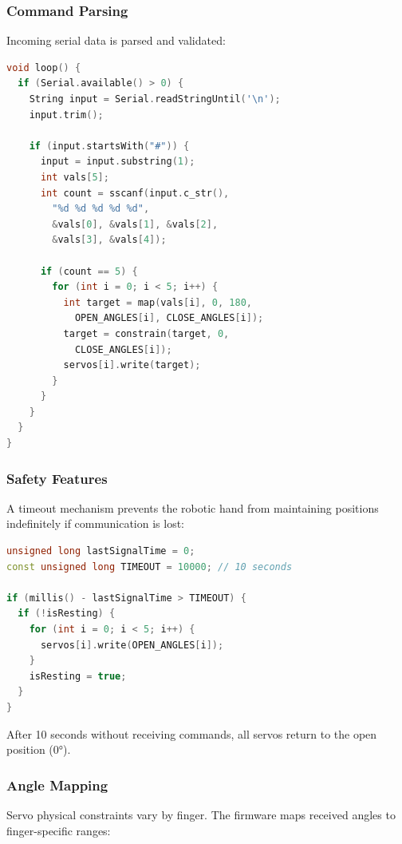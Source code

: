 \documentclass[12pt]{article}
\begin{document}
\subsubsection{Command Parsing}

Incoming serial data is parsed and validated:

\begin{lstlisting}[language=C++, caption=Command Parsing]
void loop() {
  if (Serial.available() > 0) {
    String input = Serial.readStringUntil('\n');
    input.trim();
    
    if (input.startsWith("#")) {
      input = input.substring(1);
      int vals[5];
      int count = sscanf(input.c_str(), 
        "%d %d %d %d %d", 
        &vals[0], &vals[1], &vals[2], 
        &vals[3], &vals[4]);

      if (count == 5) {
        for (int i = 0; i < 5; i++) {
          int target = map(vals[i], 0, 180, 
            OPEN_ANGLES[i], CLOSE_ANGLES[i]);
          target = constrain(target, 0, 
            CLOSE_ANGLES[i]);
          servos[i].write(target);
        }
      }
    }
  }
}
\end{lstlisting}

\subsubsection{Safety Features}

A timeout mechanism prevents the robotic hand from maintaining positions indefinitely if communication is lost:

\begin{lstlisting}[language=C++, caption=Timeout Safety Mechanism]
unsigned long lastSignalTime = 0;
const unsigned long TIMEOUT = 10000; // 10 seconds

if (millis() - lastSignalTime > TIMEOUT) {
  if (!isResting) {
    for (int i = 0; i < 5; i++) {
      servos[i].write(OPEN_ANGLES[i]);
    }
    isResting = true;
  }
}
\end{lstlisting}

After 10 seconds without receiving commands, all servos return to the open position (0°).

\subsubsection{Angle Mapping}

Servo physical constraints vary by finger. The firmware maps received angles to finger-specific ranges:
\end{document}

